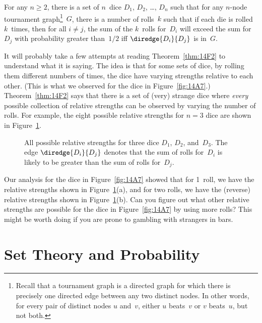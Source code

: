 \begin{theorem}\label{thm:14F2}
For any $n \ge 2$, there is a set of $n$~dice $D_1$, $D_2$, \dots,
$D_n$ such that for any $n$-node tournament graph\footnote{Recall that
  a tournament graph is a directed graph for which there is precisely
  one directed edge between any two distinct nodes.  In other words,
  for every pair of distinct nodes $u$ and~$v$, either $u$ beats~$v$
  or $v$ beats~$u$, but not both.}~$G$, there is a number of rolls~$k$
such that if each die is rolled $k$~times, then for all $i \ne j$, the
sum of the $k$~rolls for~$D_i$ will exceed the sum for~$D_j$ with
probability greater than~$1/2$ iff $\diredge{D_i}{D_j}$ is in~$G$.
\end{theorem}

It will probably take a few attempts at reading Theorem~\ref{thm:14F2}
to understand what it is saying. The idea is that for some sets of
dice, by rolling them different numbers of times, the dice have
varying strengths relative to each other.  (This is what we observed
for the dice in Figure~\ref{fig:14A7}.)  Theorem~\ref{thm:14F2} says
that there is a set of (very) strange dice where \emph{every} possible
collection of relative strengths can be observed by varying the number
of rolls.  For example, the eight possible relative strengths for $n =
3$ dice are shown in Figure~\ref{fig:14A13}.  

\begin{figure}


\caption{All possible relative strengths for three dice $D_1$, $D_2$,
  and~$D_3$.  The edge $\diredge{D_i}{D_j}$ denotes that the sum of
  rolls for~$D_i$ is likely to be greater than the sum of rolls
  for~$D_j$.}

\label{fig:14A13}

\end{figure}

Our analysis for the dice in Figure~\ref{fig:14A7} showed that for
1~roll, we have the relative strengths shown in
Figure~\ref{fig:14A13}(a), and for two rolls, we have the (reverse)
relative strengths shown in Figure~\ref{fig:14A13}(b). Can you figure
out what other relative strengths are possible for the dice in
Figure~\ref{fig:14A7} by using more rolls?  This might be worth doing
if you are prone to gambling with strangers in bars.

\section{Set Theory and Probability}

